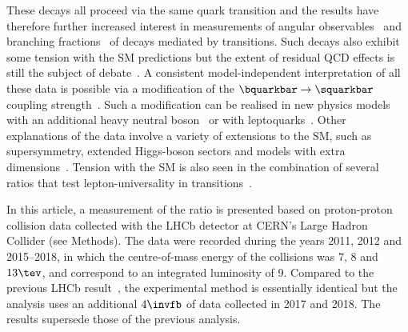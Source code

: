 These decays all proceed via
 the same \btosbar quark transition and the results have therefore further increased interest in measurements of angular observables~\cite{LHCb-PAPER-2020-041,LHCb-PAPER-2020-002,LHCb-PAPER-2015-051,Aaboud:2018krd,Aubert:2006vb,Lees:2015ymt,Wei:2009zv,Wehle:2016yoi,Aaltonen:2011ja,Khachatryan:2015isa,Sirunyan:2017dhj} and branching fractions~\cite{LHCb-PAPER-2016-012, LHCb-PAPER-2015-023, LHCb-PAPER-2014-006, LHCb-PAPER-2015-009} of decays mediated by \btosmumubar transitions. Such decays also exhibit some tension with the SM predictions but the extent of residual QCD effects is still the subject of debate~\cite{Jager:2014rwa, Descotes-Genon:2015uva,Lyon:2014hpa,Khodjamirian:2012rm,Khodjamirian:2010vf,Descotes-Genon:2014uoa,Horgan:2013pva, Beaujean:2013soa, Hambrock:2013zya, Altmannshofer:2013foa,Bobeth:2017vxj}.
A consistent model-independent interpretation of all these data is possible via a modification of the \mbox{$\bquarkbar \to \squarkbar$} coupling strength~\cite{Ciuchini:2020gvn,Kowalska:2019ley,Alguero:2019ptt,Hurth:2020rzx,Ciuchini:2019usw,Aebischer:2019mlg,Alok:2019ufo}. 
Such a modification can be realised in new physics models with an additional heavy neutral boson~\cite{Altmannshofer:2014cfa, Crivellin:2015mga, Celis:2015ara, Falkowski:2015zwa,Allanach:2019mfl,Allanach:2019iiy,Kawamura:2019rth,Dwivedi:2019uqd,Han:2019diw,Capdevila:2020rrl,Altmannshofer:2019xda,Chen:2020szf,Carvunis:2020exc,Karozas:2020zvv,Borah:2020swo,Allanach:2020kss,Sheng:2021tom} or with leptoquarks~\cite{Hiller:2014yaa,Gripaios:2014tna,Varzielas:2015iva,Barbieri:2016las,Bordone2018,Fornal:2018dqn,Balaji:2019kwe,Cornella:2019hct,Datta:2019tuj,Popov:2019tyc,Bigaran:2019bqv,Bernigaud:2019bfy,DaRold:2019fiw,Fuentes-Martin:2019bue,Hati:2019ufv,Datta:2019bzu,Crivellin:2019dwb,Borschensky:2020hot,Saad:2020ihm,Fuentes-Martin:2020bnh,Dev:2020qet,Fornal:2020ngq,Davighi:2020qqa}. Other explanations of the data involve a variety of extensions to the SM, such as supersymmetry, extended Higgs-boson sectors and models with extra dimensions~\cite{Barman:2018jhz,Shaw:2019fin,Arnan:2019uhr,Trifinopoulos:2019lyo,DelleRose:2019ukt,Ordell:2019zws,Marzo:2019ldg,Darme:2020hpo,Hu:2019ahp,Hu:2020yvs}.
Tension with the SM is also seen in the combination of several ratios that test lepton-universality in \btoclnubar transitions~\cite{Lees:2012xj,LHCb-PAPER-2017-035,Lees:2013uzd,Sato:2016svk,LHCb-PAPER-2015-025,Huschle:2015rga,LHCb-PAPER-2017-027,Belle:2019rba,Hirose:2017dxl}. 
 
In this article, a measurement of the \RK ratio is presented based on proton-proton collision data collected with the LHCb detector at CERN’s Large Hadron Collider (see Methods). The data were recorded during the years 2011, 2012 and 2015--2018, in which the centre-of-mass energy of the collisions was $7$, $8$ and $13\tev$, and correspond to an integrated luminosity of 9\invfb. Compared to the previous LHCb \RK result~\cite{LHCb-PAPER-2019-009}, the experimental method is essentially identical but the analysis uses an additional $4\invfb$ of data collected in 2017 and 2018. The results supersede those of the previous \lhcb analysis. 

